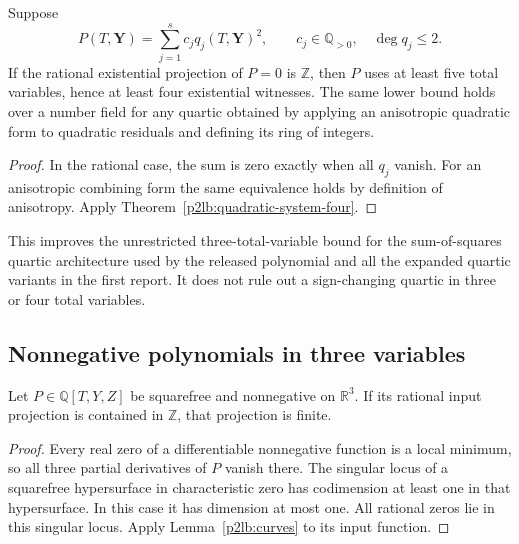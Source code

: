 \begin{corollary}\label{p2lb:sos-five}
Suppose
\[
 P(T,\mathbf Y)=\sum_{j=1}^s c_jq_j(T,\mathbf Y)^2,
 \qquad c_j\in\mathbb Q_{>0},\quad\deg q_j\leq2.
\]
If the rational existential projection of $P=0$ is $\mathbb Z$,
then $P$ uses at least five total variables, hence at least four
existential witnesses.
The same lower bound holds over a number field for any quartic
obtained by applying an anisotropic quadratic form to quadratic
residuals and defining its ring of integers.
\end{corollary}
\begin{proof}
In the rational case, the sum is zero exactly when all $q_j$ vanish.
For an anisotropic combining form the same equivalence holds by
definition of anisotropy.  Apply Theorem~\ref{p2lb:quadratic-system-four}.
\end{proof}

This improves the unrestricted three-total-variable bound for the
sum-of-squares quartic architecture used by the released polynomial
and all the expanded quartic variants in the first report.  It does
not rule out a sign-changing quartic in three or four total variables.

\subsection{Nonnegative polynomials in three variables}

\begin{proposition}\label{p2lb:nonnegative-squarefree}
Let $P\in\mathbb Q[T,Y,Z]$ be squarefree and nonnegative on
$\mathbb R^3$.  If its rational input projection is contained in
$\mathbb Z$, that projection is finite.
\end{proposition}
\begin{proof}
Every real zero of a differentiable nonnegative function is a local
minimum, so all three partial derivatives of $P$ vanish there.
The singular locus of a squarefree hypersurface in characteristic
zero has codimension at least one in that hypersurface.  In this
case it has dimension at most one.  All rational zeros lie in this
singular locus.  Apply Lemma~\ref{p2lb:curves} to its input function.
\end{proof}

